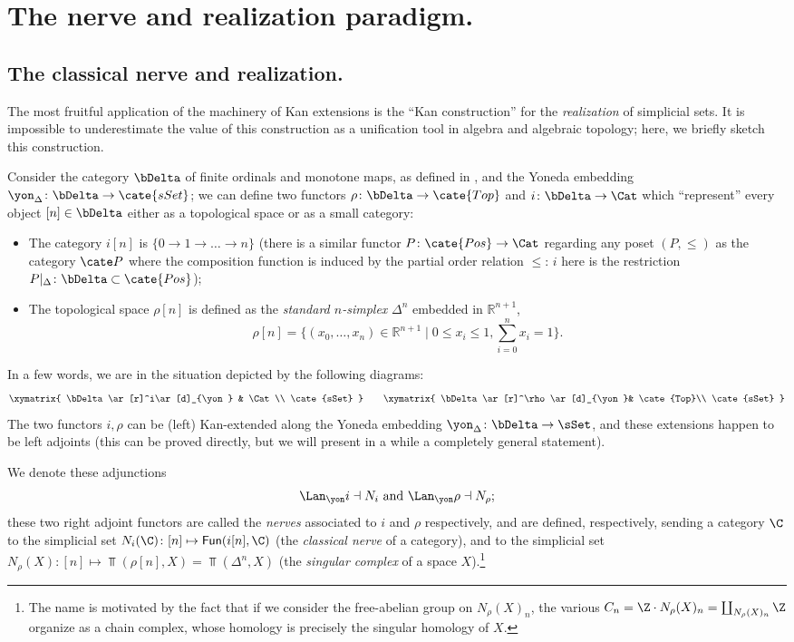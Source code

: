 \section{The nerve and realization paradigm.}\label{section:nr}
\subsection{The classical nerve and realization.}
The most fruitful application of the machinery of Kan extensions is the ``Kan construction'' for the \emph{realization} of simplicial sets. It is impossible to underestimate the value of this construction as a unification tool in algebra and algebraic topology; here, we briefly sketch this construction. 

Consider the category $\bDelta$ of finite ordinals and monotone maps, as  defined in \cite{GoJ}, and the Yoneda embedding $\yon_\Delta \colon \bDelta \to \cate{sSet}$; we can define two  functors $\rho\colon \bDelta\to \cate{Top}$ and $i\colon \bDelta\to \Cat$ which ``represent'' every object $[n]\in\bDelta$ either as a topological space or as a small category:
\begin{itemize}
\item The category $i[n]$ is $\{0\to 1\to\dots\to n\}$ (there is a similar functor $P \colon \cate{Pos}\to \Cat$ regarding any poset $(P,\le)$ as the category $\cate P$ where the composition function is induced by the partial order relation $\le$: $i$ here is the restriction $P|_\Delta \colon \bDelta\subset \cate{Pos}$);
\item The topological space $\rho[n]$ is defined as the \emph{standard $n$-simplex} $\Delta^n$ embedded in $\mathbb{R}^{n+1}$, 
\[
\rho[n] = \Big\{(x_0, \dots, x_n) \in \mathbb{R}^{n+1} \mid 0\leq x_i \leq 1, \textstyle \sum_{i=0}^n x_i = 1 \Big\}.
\]
\end{itemize}
In a few words, we are in the situation depicted by the following diagrams:
\[
\xymatrix{
\bDelta \ar[r]^i\ar[d]_{\yon } & \Cat \\
\cate{sSet}
}\qquad 
\xymatrix{
\bDelta \ar[r]^\rho\ar[d]_{\yon }& \cate{Top}\\
\cate{sSet}
}
\]
The two functors $i,\rho$ can be (left) Kan-extended along the Yoneda embedding $\yon_\Delta\colon \bDelta \to \sSet$, and these extensions happen to be left adjoints (this can be proved directly, but we will present in a while a completely general statement).

We denote these adjunctions
\[
\Lan_\yon i\dashv N_i \text{ and } \Lan_\yon \rho\dashv N_\rho;
\] 
these two right adjoint functors are called the \emph{nerves} associated to $i$ and $\rho$ respectively, and are defined, respectively, sending a category $\C$ to the simplicial set $N_i(\C)\colon [n]\mapsto \textsf{Fun}(i[n],\C)$ (the \emph{classical nerve} of a category), and to the simplicial set $N_\rho(X)\colon[n]\mapsto \Top(\rho[n], X) = \Top(\Delta^n, X)$ (the \emph{singular complex} of a space $X$).\footnote{The name is motivated by the fact that if we consider the free-abelian group on $N_\rho(X)_n$, the various $C_n = \Z\cdot N_\rho(X)_n = \coprod_{ N_\rho(X)_n}\Z$ organize as a chain complex, whose homology is precisely the singular homology of $X$.}

